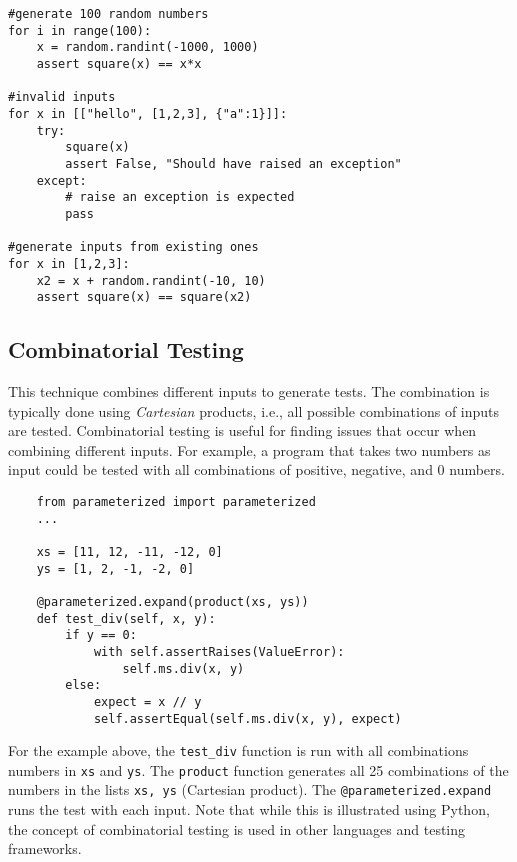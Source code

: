 \documentclass[oneside,11pt,dvipsnames]{book}
\newcommand{\code}[1]{\texttt{#1}}
\begin{document}
\begin{lstlisting}
#generate 100 random numbers
for i in range(100):
    x = random.randint(-1000, 1000)
    assert square(x) == x*x

#invalid inputs
for x in [["hello", [1,2,3], {"a":1}]]:
    try:
        square(x)
        assert False, "Should have raised an exception"
    except:
        # raise an exception is expected
        pass
    
#generate inputs from existing ones
for x in [1,2,3]:
    x2 = x + random.randint(-10, 10)
    assert square(x) == square(x2)
\end{lstlisting}




\subsection{Combinatorial Testing}\label{sec:combinatorial-testing}
This technique combines different inputs to generate tests.  The combination is typically done using \emph{Cartesian} products, i.e., all possible combinations of inputs are tested. Combinatorial testing is useful for finding issues that occur when combining different inputs. For example, a program that takes two numbers as input could be tested with all combinations of positive, negative, and 0 numbers. 

\begin{lstlisting}
    from parameterized import parameterized
    ...

    xs = [11, 12, -11, -12, 0]
    ys = [1, 2, -1, -2, 0]

    @parameterized.expand(product(xs, ys))
    def test_div(self, x, y):
        if y == 0:
            with self.assertRaises(ValueError):
                self.ms.div(x, y)
        else:
            expect = x // y            
            self.assertEqual(self.ms.div(x, y), expect)
\end{lstlisting}

For the example above, the \code{test\_div} function is run with all combinations numbers in \code{xs} and \code{ys}. The \code{product} function generates all 25 combinations of the numbers in the lists \code{xs, ys} (Cartesian product). The \code{@parameterized.expand} runs the test with each input. Note that while this is illustrated using Python, the concept of combinatorial testing is used in other languages and testing frameworks.
\end{document}
